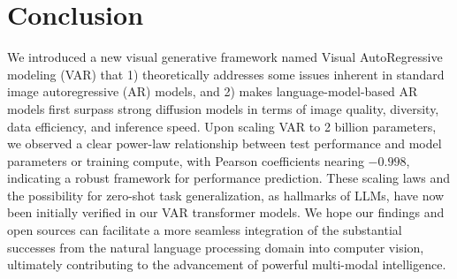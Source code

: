 \vspace{-4pt}
\section{Conclusion} \label{sec:conc}
\vspace{-4pt}

We introduced a new visual generative framework named Visual AutoRegressive modeling (VAR) that 1) theoretically addresses some issues inherent in standard image autoregressive (AR) models, and 2) makes language-model-based AR models first surpass strong diffusion models in terms of image quality, diversity, data efficiency, and inference speed.
Upon scaling VAR to 2 billion parameters, we observed a clear power-law relationship between test performance and model parameters or training compute, with Pearson coefficients nearing $-0.998$, indicating a robust framework for performance prediction.
These scaling laws and the possibility for zero-shot task generalization, as hallmarks of LLMs, have now been initially verified in our VAR transformer models.
We hope our findings and open sources can facilitate a more seamless integration of the substantial successes from the natural language processing domain into computer vision, ultimately contributing to the advancement of powerful multi-modal intelligence.

